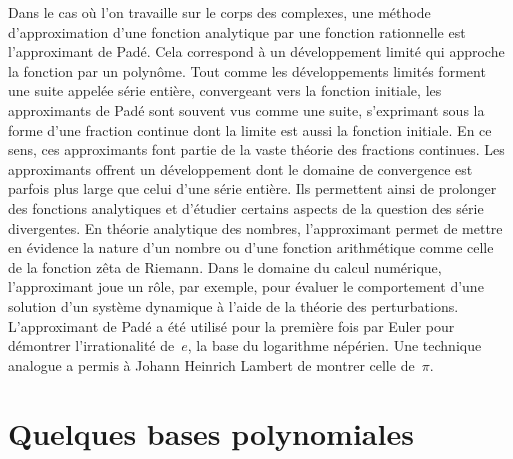  Dans le cas où l'on travaille sur le corps des complexes, une méthode d'approximation d'une fonction analytique par une fonction rationnelle est l'approximant de Padé. Cela correspond à un développement limité qui approche la fonction par un polynôme. Tout comme les développements limités forment une suite appelée série entière, convergeant vers la fonction initiale, les approximants de Padé sont souvent vus comme une suite, s'exprimant sous la forme d'une fraction continue dont la limite est aussi la fonction initiale. En ce sens, ces approximants font partie de la vaste théorie des fractions continues. Les approximants offrent un développement dont le domaine de convergence est parfois plus large que celui d'une série entière. Ils permettent ainsi de prolonger des fonctions analytiques et d'étudier certains aspects de la question des série divergentes. En théorie analytique des nombres, l'approximant permet de mettre en évidence la nature d'un nombre ou d'une fonction arithmétique comme celle de la fonction zêta de Riemann. Dans le domaine du calcul numérique, l'approximant joue un rôle, par exemple, pour évaluer le comportement d'une solution d'un système dynamique à l'aide de la théorie des perturbations. L'approximant de Padé a été utilisé pour la première fois par Euler pour démontrer l'irrationalité de~$e$, la base du logarithme népérien. Une technique analogue a permis à Johann Heinrich Lambert de montrer celle de~$\pi$.



\section{Quelques bases polynomiales} 
